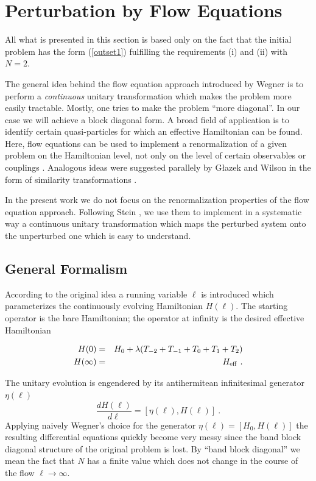 \section{Perturbation by Flow Equations}

All what is presented in this section is based only on
the fact that the initial problem has the form (\ref{outset1})
fulfilling the requirements (i) and (ii) with $N=2$.

The general idea behind the flow equation approach introduced
by Wegner \cite{wegne94} is to perform a {\em continuous}
unitary transformation which makes the problem more easily
tractable. Mostly, one tries to make the problem ``more
diagonal''. In our case we will achieve a block diagonal form.
A broad field of application is to identify certain quasi-particles
for which an effective Hamiltonian can be found. Here, flow equations
can be used to implement a renormalization of a given problem on the
Hamiltonian level, not only  on the level of certain observables or couplings
\cite{wegne94,kehre96a,kehre96b}. Analogous ideas were 
suggested parallely by G{\l}azek
and Wilson in the form of similarity transformations \cite{glaze93}.

In the present work we do not focus on the renormalization properties of
the flow equation approach. Following Stein \cite{stein97}, we use them to
 implement in a systematic way a continuous unitary transformation which maps 
the perturbed system onto the unperturbed one which is easy to understand.

\subsection{General Formalism}
According to the original idea a running variable $\ell$ is 
introduced which parameterizes the continuously evolving 
Hamiltonian $H(\ell)$. The starting operator is the bare
Hamiltonian;
the operator at infinity is the desired effective Hamiltonian
\begin{mathletters}
\begin{eqnarray}
\label{startcond}
H(0) &=& H_0+\lambda (T_{-2}+T_{-1}+T_{0}+T_{1}+T_{2})\\
H(\infty) &=& H_{\rm eff}\ .
\end{eqnarray}
\end{mathletters}
 The unitary evolution is engendered by its
antihermitean infinitesimal generator $\eta(\ell)$
\begin{equation}
\label{flow}
\frac{dH(\ell)}{d\ell} = [\eta(\ell), H(\ell)]\ .
\end{equation}
Applying naively Wegner's choice for the generator
 $\eta(\ell) =[H_0,H(\ell)]$ the resulting differential equations
quickly become very messy since the band block diagonal structure
of the original problem is lost.
By ``band block diagonal'' we mean the fact that $N$ has a finite value
which does not change in the course of the flow $\ell\to\infty$. 

